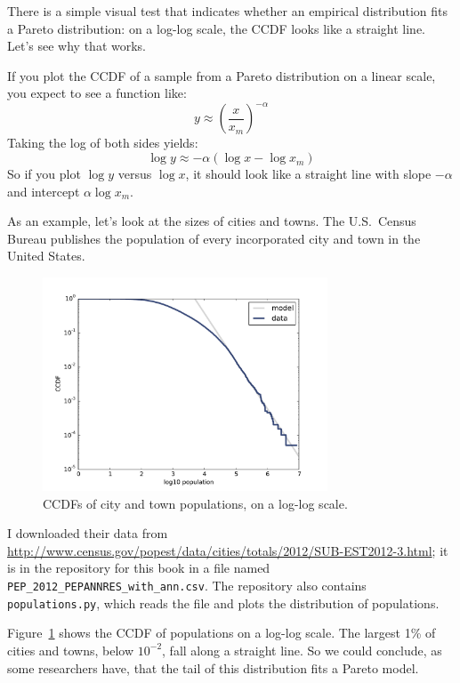 \documentclass[12pt]{book}
\begin{document}
There is a simple visual test that indicates whether an empirical
distribution fits a Pareto distribution: on a log-log scale, the CCDF
looks like a straight line.  Let's see why that works.

If you plot the CCDF of a sample from a Pareto distribution on a
linear scale, you expect to see a function like:
%
\[ y \approx \left( \frac{x}{x_m} \right) ^{-\alpha} \]
%
Taking the log of both sides yields:
%
\[ \log y \approx -\alpha (\log x - \log x_{m})\]
%
So if you plot $\log y$ versus $\log x$, it should look like a straight
line with slope $-\alpha$ and intercept
$\alpha \log x_{m}$.

As an example, let's look at the sizes of cities and towns.
The U.S.~Census Bureau publishes the
population of every incorporated city and town in the United States.
 
  

\begin{figure}
\centerline{\includegraphics[height=2.5in]{figs/populations_pareto.pdf}}
\caption{CCDFs of city and town populations, on a log-log scale.}
\label{populations_pareto}
\end{figure}

I downloaded their data from
\url{http://www.census.gov/popest/data/cities/totals/2012/SUB-EST2012-3.html};
it is in the repository for this book in a file named
\verb"PEP_2012_PEPANNRES_with_ann.csv".  The repository also
contains {\tt populations.py}, which reads the file and plots
the distribution of populations.

Figure~\ref{populations_pareto} shows the CCDF of populations on a
log-log scale.  The largest 1\% of cities and towns, below $10^{-2}$,
fall along a straight line.  So we could
conclude, as some researchers have, that the tail of this distribution
fits a Pareto model.
\end{document}
